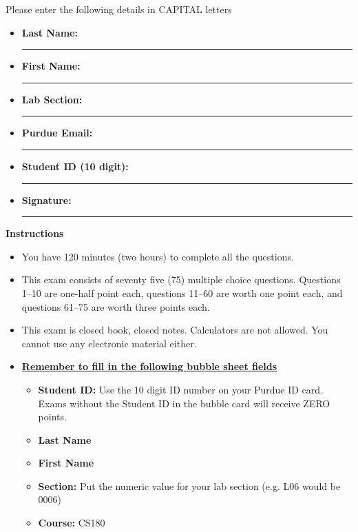 \documentclass[S17-Final.tex]{subfiles}
\begin{document}
 
Please enter the following details in CAPITAL letters
\begin{itemize}
\item \textbf{Last Name:} \noindent\rule{8cm}{0.4pt}
\item \textbf{First Name:} \noindent\rule{8cm}{0.4pt}
\item \textbf{Lab Section:} \noindent\rule{8cm}{0.4pt}
\item \textbf{Purdue Email:} \noindent\rule{8cm}{0.4pt}
\item \textbf{Student ID (10 digit):} \noindent\rule{8cm}{0.4pt}
\item \textbf{Signature:} \noindent\rule{8cm}{0.4pt}
\end{itemize}

\begin{mdframed}[style=MyFrame]
\begin{center}\textbf{Instructions}\end{center}
\begin{itemize}
\item You have 120 minutes (two hours) to complete all the questions.
\item  This exam consists of seventy five (75) multiple choice questions. Questions 1--10 are one-half point each, questions 11--60 are worth one point each, and questions 61--75 are worth three points each.
\item This exam is closed book, closed notes. Calculators are not allowed. You cannot use any electronic material either.

\item \textbf{\underline{Remember to fill in the following bubble sheet fields}}
\begin{itemize}
\item \textbf{Student ID:} Use the 10 digit ID number on your Purdue ID card. Exams without the Student ID in the bubble card will receive ZERO points.
\item \textbf{Last Name} 
\item \textbf{First Name}
\item \textbf{Section:} Put the numeric value for your lab section (e.g. L06 would be 0006)
\item \textbf{Course:} CS180
\end{itemize}
\end{itemize}
\end{mdframed}
\end{document}
